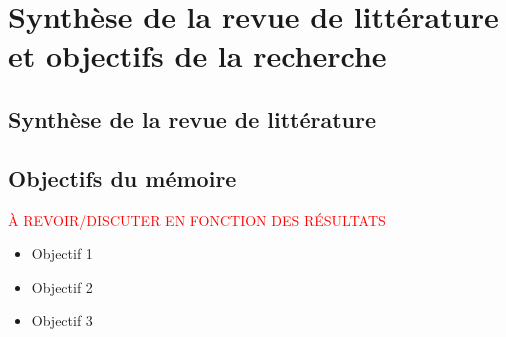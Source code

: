 \chapter{Synthèse de la revue de littérature et objectifs de la recherche}\label{sec:SyntheseRev}
\section{Synthèse de la revue de littérature}

\section{Objectifs du mémoire}

\textcolor{red}{À REVOIR/DISCUTER EN FONCTION DES RÉSULTATS}

\begin{itemize} %
    \item Objectif 1
    
    \item Objectif 2
    
    \item Objectif 3
\end{itemize}